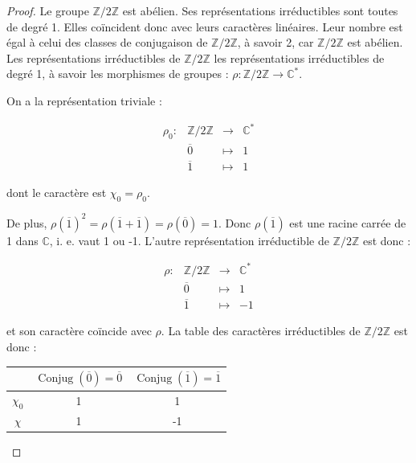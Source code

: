 \documentclass[french]{book}
\theoremstyle{definition}
\theoremstyle{remark}
\begin{document}
\begin{proof}
  Le groupe \(\mathbb{Z}/{ 2 }\mathbb{Z}\) est abélien. Ses représentations irréductibles sont toutes de degré 1. Elles co\"incident donc avec leurs caractères linéaires. Leur nombre est égal à celui des classes de conjugaison de \(\mathbb{Z}/{ 2 }\mathbb{Z}\), à savoir 2, car \(\mathbb{Z}/{2}\mathbb{Z}\) est abélien. Les représentations irréductibles de \(\mathbb{Z}/{ 2 }\mathbb{Z}\) les représentations irréductibles de degré 1, à savoir les morphismes de groupes : \(\rho : \mathbb{Z}/{ 2 }\mathbb{Z} \longrightarrow \mathbb{C} ^{*}\).

  On a la représentation triviale :

  \[\begin{matrix}
  \rho_0 : & \mathbb{Z}/{ 2 }\mathbb{Z} & \longrightarrow & \mathbb{C} ^{*} \\
  \ & \overline{0}  & \longmapsto & 1 \\
  \ & \overline{1}  & \longmapsto & 1
  \end{matrix}\]

  dont le caractère est \(\chi_0 = \rho_0\).

  De plus, \(\rho(\overline{1})^2 = \rho(\overline{1}+ \overline{1}) = \rho(\overline{0}) = 1\). Donc \(\rho(\overline{1})\) est une racine carrée de 1 dans \(\mathbb{C}\), i. e. vaut 1 ou -1. L'autre représentation irréductible de \(\mathbb{Z}/{ 2 }\mathbb{Z}\) est donc :

  \[\begin{matrix}
  \rho : & \mathbb{Z}/{ 2 }\mathbb{Z} & \longrightarrow & \mathbb{C} ^{*} \\
  \ & \overline{0}  & \longmapsto & 1 \\
  \ & \overline{1}  & \longmapsto & -1
  \end{matrix}\]

  et son caractère co\"incide avec \(\rho\). La table des caractères irréductibles de \(\mathbb{Z}/{ 2 }\mathbb{Z}\) est donc :

  \begin{center}
    \begin{tabular}{|c|c|c|}
      \hline
      \ & $ \operatorname{Conjug}(\overline{0}) = \overline{0} $ & $ \operatorname{Conjug}(\overline{1}) = \overline{1}$ \\
      \hline
      $\chi_0$ & 1 & 1 \\
      \hline
      $\chi$ & 1 & -1 \\
      \hline
    \end{tabular}
  \end{center}


\end{proof}
\end{document}
